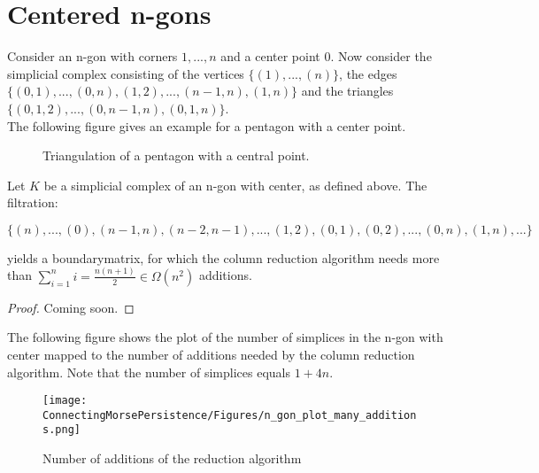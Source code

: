 
\section{Centered n-gons}
Consider an n-gon with corners ${1,...,n}$ and a center point $0$. Now consider the simplicial complex consisting of the vertices $\{(1),...,(n)\}$, the edges $\{(0,1),...,(0,n),(1,2),...,(n-1,n),(1,n)\}$ and the triangles \\$\{(0,1,2),...,(0,n-1,n),(0,1,n)\}$. \\The following figure gives an example for a pentagon with a center point.


\begin{figure}[H]
\noindent%
\centering%
%
\caption{Triangulation of a pentagon with a central point.}
\label{fig:centeredpentagon}
\end{figure}

\begin{lemma}
Let $K$ be a simplicial complex of an n-gon with center, as defined above. The filtration: 
\begin{center}
    $\{(n),...,(0),(n-1,n),(n-2,n-1),...,(1,2),(0,1),(0,2),...,(0,n),(1,n),...\}$
\end{center}
yields a boundarymatrix, for which the column reduction algorithm needs more than $\sum_{i=1}^n i = \frac{n(n+1)}{2} \in \Omega(n^2)$ additions.
\end{lemma}
\begin{proof}
Coming soon.
\end{proof}

The following figure shows the plot of the number of simplices in the n-gon with center mapped to the number of additions needed by the column reduction algorithm. Note that the number of simplices equals $1+4n$.


\begin{figure}[H]
\noindent%
\centering%
\centering%
\texttt{[image: ConnectingMorsePersistence/Figures/n\_gon\_plot\_many\_additions.png]}

\caption{Number of additions of the reduction algorithm}
\label{fig:quadratic_plot
}
\end{figure}

